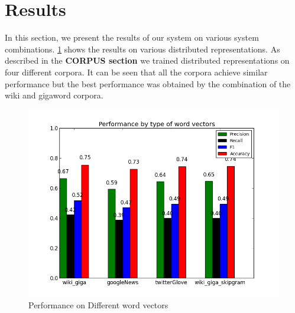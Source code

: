\documentclass[conference]{IEEEtran}
\begin{document}
\section{Results}
In this section, we present the results of our system on various system combinations. \ref{vectorSelect} shows the results on various distributed representations. As described in the \textbf{CORPUS section} we trained distributed representations on four different corpora. It can be seen that all the corpora achieve similar performance but the best performance was obtained by the combination of the wiki and gigaword corpora.\\
\begin{figure}
	\centering
	\includegraphics[scale=0.4]{cmp_vecs.png}
	\caption{Performance on Different word vectors}
	\label{vectorSelect}
\end{figure}
\end{document}
